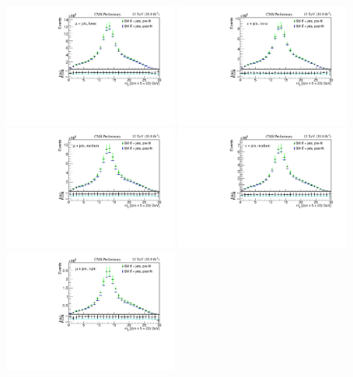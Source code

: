 \begin{figure}
\centering
{\includegraphics[width=0.49\textwidth]{Image/PostFit/ttbarPostFit_ch1.pdf}}
{\includegraphics[width=0.49\textwidth]{Image/PostFit/ttbarPostFit_ch4.pdf}}
{\includegraphics[width=0.49\textwidth]{Image/PostFit/ttbarPostFit_ch2.pdf}}
{\includegraphics[width=0.49\textwidth]{Image/PostFit/ttbarPostFit_ch5.pdf}}
{\includegraphics[width=0.49\textwidth]{Image/PostFit/ttbarPostFit_ch3.pdf}}

\end{figure}
